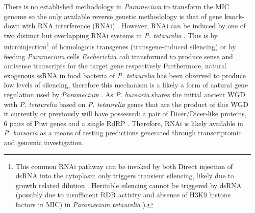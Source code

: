 There is no established methodology in \textit{Paramecium} to transform the MIC genome so the only available reverse genetic methodology is that of
gene knock-down with RNA interference (RNAi) \citep{Marker2014}.  
However, RNAi can be induced by one of two distinct but overlapping RNAi systems in \textit{P. tetaurelia} \citep{Marker2014}.
This is by microinjection\footnote{ This common RNAi pathway can be invoked by both Direct injection of dsRNA into the cytoplasm only triggers transient silencing, likely due to growth related dilution \citep{Galvani2002}.
Heritable silencing cannot be triggered by dsRNA (possibly due to insufficient RDR activity and absence of H3K9 histone factors in MIC) in \textit{Paramecium tetaurelia} \citep{Kiefer2013}).}
of homologous transgenes (transgene-induced silencing) or by feeding \textit{Paramecium} cells
\textit{Escherichia coli} transformed to produce sense and antisense transcripts for the target gene respectively \citep{Galvani2002}
Furthermore, natural exogenous ssRNA in food bacteria of \textit{P. tetaurelia} has been observed to produce low levels of silencing, therefore this mechanism
is a likely a form of natural gene regulation used by \textit{Paramecium} \citep{Carradec2015}.
As \textit{P. bursaria} shares the initial ancient WGD with \textit{P. tetaurelia} \citep{Aury2006} based on \textit{P. tetaurelia} genes that are the 
product of this WGD it currently or previously will have possessed: a pair of Dicer/Dicer-like proteins, 6 pairs of Piwi genes and a single RdRP \citep{Marker2014}.
Therefore, RNAi is likely available in \textit{P. bursaria} as a means of testing predictions generated through transcriptomic and genomic investigation.


